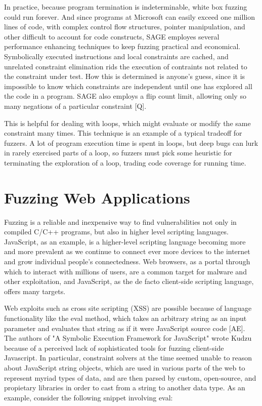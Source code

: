 \documentclass[11pt,expanded,copyright]{fsuthesis}
\begin{document}
In practice, because program termination is indeterminable, white box fuzzing could run forever. And since programs at Microsoft can easily exceed one million lines of code, with complex control flow structures, pointer manipulation, and other difficult to account for code constructs, SAGE employes several performance enhancing techniques to keep fuzzing practical and economical. Symbolically executed instructions and local constraints are cached, and unrelated constraint elimination rids the execution of contraints not related to the constraint under test. How this is determined is anyone's guess, since it is impossible to know which constraints are independent until one has explored all the code in a program. SAGE also employs a flip count limit, allowing only so many negations of a particular constraint [Q]. 

This is helpful for dealing with loops, which might evaluate or modify the same constraint many times. This technique is an example of a typical tradeoff for fuzzers. A lot of program execution time is spent in loops, but deep bugs can lurk in rarely exercised parts of a loop, so fuzzers must pick some heuristic for terminating the exploration of a loop, trading code coverage for running time.


\section{Fuzzing Web Applications}

Fuzzing is a reliable and inexpensive way to find vulnerabilities not only in compiled C/C++ programs, but also in higher level scripting languages. JavaScript, as an example, is a higher-level scripting language becoming more and more prevalent as we continue to connect ever more devices to the internet and grow individual people's connectedness. Web browsers, as a portal through which to interact with millions of users, are a common target for malware and other exploitation, and JavaScript, as the de facto client-side scripting language, offers many targets. 

Web exploits such as cross site scripting (XSS) are possible because of language functionality like the eval method, which takes an arbitrary string as an input parameter and evaluates that string as if it were JavaScript source code [AE]. The authors of "A Symbolic Execution Framework for JavaScript" wrote Kudzu because of a perceived lack of sophisticated tools for fuzzing client-side Javascript. In particular, constraint solvers at the time seemed unable to reason about JavaScript string objects, which are used in various parts of the web to represent myriad types of data, and are then parsed by custom, open-source, and propietary libraries in order to cast from a string to another data type. As an example, consider the following snippet involving eval:
\end{document}
